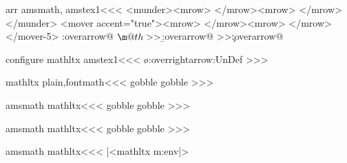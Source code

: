 {{%


\<arr amsmath, amstex1\><<<
   {\Tg<munder>\Tg<mrow\Hnewline>}
   {\Tg</mrow>\Tg<mrow\Hnewline>}
   {\Tg</mrow>\Tg</munder>}
   {\Tg<mover accent="true">\Tg<mrow\Hnewline>}
   {\Tg</mrow>\Tg<mrow>}
   {\Tg</mrow>\Tg</mover-5>}
\def\:tempc#1#2#3{\a:overarrow@
      \hbox{$\m@th#2#3$}\b:overarrow@
      \hbox{#1#2}\c:overarrow@
   }
\HLet\overarrow@\:tempc
>>>





\<configure mathltx amstex1\><<<
\ifx \o:overrightarrow:\:UnDef\else     
   \HRestore\overrightarrow
   \HRestore\overleftarrow
   \HRestore\overleftrightarrow
\fi
>>>



\<mathltx plain,fontmath\><<<
  {\:gobble}
  {}
  {\:gobble}
  {}
>>>


\<amsmath mathltx\><<<
  {\:gobble}
  {}
  {\:gobble}
  {}
>>>


\<amsmath mathltx\><<<
  {\:gobble}
  {}
  {\:gobble}
  {}
>>>





\<amsmath mathltx\><<<
|<mathltx m:env|>
\renewcommand{\xrightarrow}[2][]{%
   \HCode{\string\xrightarrow[}#1\HCode{]\l:brace}%
                               #2\HCode{\r:brace}}
\renewcommand{\xleftarrow}[2][]{%
   \HCode{\string\xleftarrow[}#1\HCode{]\l:brace}%
                               #2\HCode{\r:brace}}

\def\overset#1#2{{%
   \HCode{\string\overset\l:brace}#1\HCode{\r:brace\l:brace}%
                           #2\HCode{\r:brace}}}
\def\underset#1#2{{%
   \HCode{\string\underset\l:brace}#1\HCode{\r:brace\l:brace}%
                           #2\HCode{\r:brace}}}

\def\sideset#1#2#3{{\HCode{\string\sideset\l:brace}%
                    {\HCode{}}#1\HCode{\r:brace\l:brace}%
                      {\HCode{}}#2\HCode{\r:brace}%
                      {{\HCode{}}#3}%
                  }}

}}
